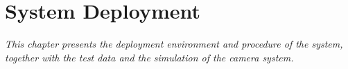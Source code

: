 \chapter{System Deployment}
\label{chapter:trienkhai}

\textit{This chapter presents the deployment environment and procedure of the system, together with the test data and the simulation of the camera system.}



